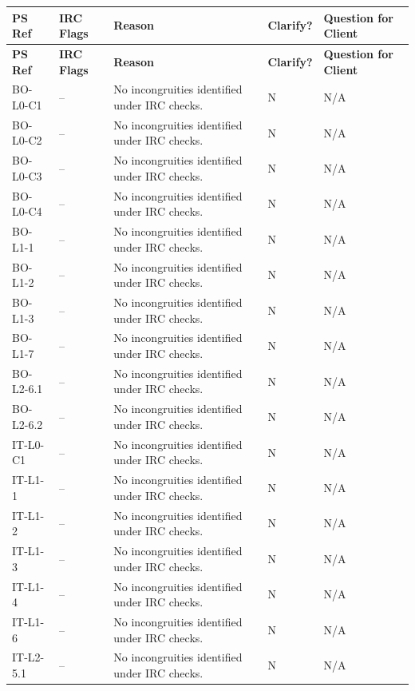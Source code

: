 \documentclass[11pt,a4paper]{article}
\begin{document}
\renewcommand{\arraystretch}{1.2}
\begin{longtable}{|p{}|p{}|p{}|p{}|p{}|}
\hline
\rowcolor{tableheader}
\textbf{PS Ref} & \textbf{IRC Flags} & \textbf{Reason} & \textbf{Clarify?} & \textbf{Question for Client} \\
\hline
\endfirsthead
\hline
\rowcolor{tableheader}
\textbf{PS Ref} & \textbf{IRC Flags} & \textbf{Reason} & \textbf{Clarify?} & \textbf{Question for Client} \\
\hline
\endhead

BO-L0-C1 & -- & No incongruities identified under IRC checks. & N & N/A \\
\hline
BO-L0-C2 & -- & No incongruities identified under IRC checks. & N & N/A \\
\hline
BO-L0-C3 & -- & No incongruities identified under IRC checks. & N & N/A \\
\hline
BO-L0-C4 & -- & No incongruities identified under IRC checks. & N & N/A \\
\hline
BO-L1-1 & -- & No incongruities identified under IRC checks. & N & N/A \\
\hline
BO-L1-2 & -- & No incongruities identified under IRC checks. & N & N/A \\
\hline
BO-L1-3 & -- & No incongruities identified under IRC checks. & N & N/A \\
\hline
BO-L1-7 & -- & No incongruities identified under IRC checks. & N & N/A \\
\hline
BO-L2-6.1 & -- & No incongruities identified under IRC checks. & N & N/A \\
\hline
BO-L2-6.2 & -- & No incongruities identified under IRC checks. & N & N/A \\
\hline
IT-L0-C1 & -- & No incongruities identified under IRC checks. & N & N/A \\
\hline
IT-L1-1 & -- & No incongruities identified under IRC checks. & N & N/A \\
\hline
IT-L1-2 & -- & No incongruities identified under IRC checks. & N & N/A \\
\hline
IT-L1-3 & -- & No incongruities identified under IRC checks. & N & N/A \\
\hline
IT-L1-4 & -- & No incongruities identified under IRC checks. & N & N/A \\
\hline
IT-L1-6 & -- & No incongruities identified under IRC checks. & N & N/A \\
\hline
IT-L2-5.1 & -- & No incongruities identified under IRC checks. & N & N/A \\
\hline

\end{longtable}
\end{document}
